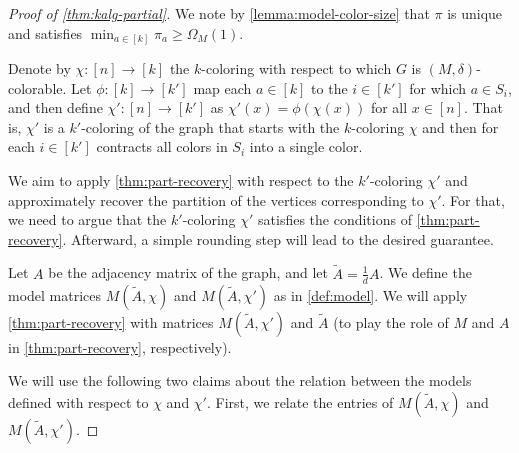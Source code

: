 \begin{proof}[Proof of \cref{thm:kalg-partial}]
    We note by \cref{lemma:model-color-size} that $\pi$ is unique and satisfies $\min_{a \in [k]} \pi_a \geq \Omega_M(1)$.

    Denote by $\chi: [n] \to [k]$ the $k$-coloring with respect to which $G$ is $(M, \delta)$-colorable.
    Let $\phi: [k] \to [k']$ map each $a \in [k]$ to the $i \in [k']$ for which $a \in S_i$, and then define $\chi' : [n] \to [k']$ as $\chi'(x) = \phi(\chi(x))$ for all $x \in [n]$.
    That is, $\chi'$ is a $k'$-coloring of the graph that starts with the $k$-coloring $\chi$ and then for each $i \in [k']$ contracts all colors in $S_i$ into a single color.

    We aim to apply \cref{thm:part-recovery} with respect to the $k'$-coloring $\chi'$ and approximately recover the partition of the vertices corresponding to $\chi'$.
    For that, we need to argue that the $k'$-coloring $\chi'$ satisfies the conditions of \cref{thm:part-recovery}.
    Afterward, a simple rounding step will lead to the desired guarantee.

    Let $A$ be the adjacency matrix of the graph, and let $\tilde{A} = \frac{1}{d}A$.
    We define the model matrices $M(\tilde{A}, \chi)$ and $M(\tilde{A}, \chi')$ as in \cref{def:model}.
    We will apply \cref{thm:part-recovery} with matrices $M(\tilde{A}, \chi')$ and $\tilde{A}$ (to play the role of $M$ and $A$ in \cref{thm:part-recovery}, respectively).

    We will use the following two claims about the relation between the models defined with respect to $\chi$ and $\chi'$.
    First, we relate the entries of $M(\tilde{A}, \chi)$ and $M(\tilde{A}, \chi')$.


\end{proof}
